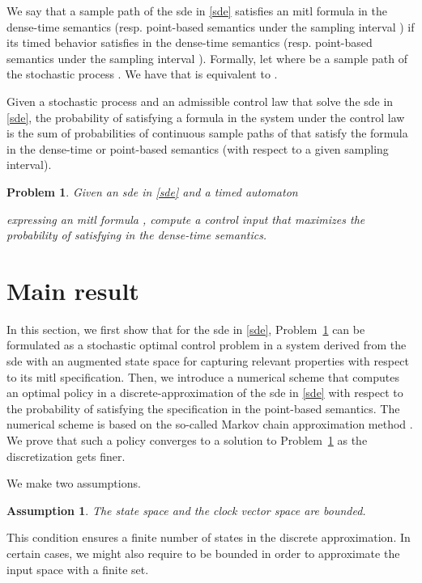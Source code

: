 \documentclass[letterpaper, 10 pt, conference]{ieeeconf}
\newtheorem{problem}{Problem}
\newtheorem{assumption}{Assumption}
\begin{document}
We say that a sample path of the \ac{sde} in \eqref{sde} satisfies an
\ac{mitl} formula  in the dense-time semantics
(resp. point-based semantics under the sampling interval ) if
its timed behavior satisfies  in the dense-time semantics
(resp. point-based semantics under the sampling interval
). Formally, let  where  be a sample
path of the stochastic process . We have that
 is
equivalent to .







Given a stochastic process  and an admissible control law
 that solve the \ac{sde} in \eqref{sde}, the probability of
satisfying a formula  in the system under the control law
 is the sum of probabilities of continuous sample paths of
 that satisfy the formula  in the dense-time or
point-based semantics (with respect to a given sampling interval).

\begin{problem}
\label{problem}
Given an \ac{sde} in \eqref{sde} and a timed automaton

expressing an \ac{mitl} formula , compute a control input
 that maximizes the probability of satisfying  in
the dense-time semantics.
\end{problem}




\section{Main result}
In this section, we first show that for the \ac{sde} in \eqref{sde},
Problem~\ref{problem} can be formulated as a stochastic optimal
control problem in a system derived from the \ac{sde} with an
augmented state space for capturing relevant properties with respect
to its \ac{mitl} specification. Then, we introduce a numerical scheme
that computes an optimal policy in a discrete-approximation of the
\ac{sde} in \eqref{sde} with respect to the probability of satisfying
the specification in the point-based semantics. The numerical scheme
is based on the so-called Markov chain approximation method
\cite{kushner2001numerical}.  We prove that such a policy converges to
a solution to Problem~\ref{problem} as the discretization gets finer.


We make two assumptions.
\begin{assumption}
\label{assumption0}
  The state space  and the clock vector space  are bounded.
\end{assumption}
This condition ensures a finite number of states in the discrete
approximation. In certain cases, we might also require  to be
bounded in order to approximate the input space with a finite set.
\end{document}
